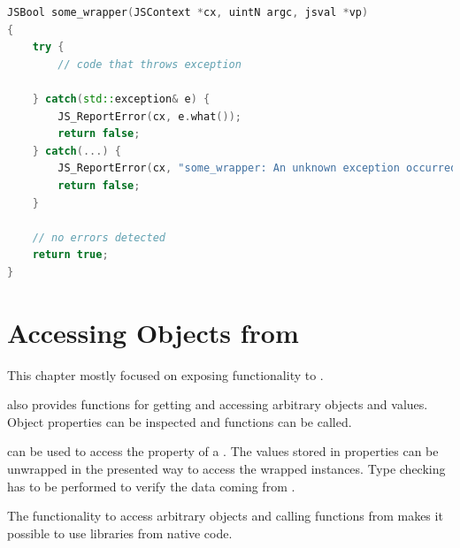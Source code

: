 \SingleSpacing
\begin{lstlisting}[language=C++, caption=Error handling at the language border]
JSBool some_wrapper(JSContext *cx, uintN argc, jsval *vp)
{
	try {
		// code that throws exception
		
	} catch(std::exception& e) {
		JS_ReportError(cx, e.what());
		return false;
	} catch(...) {
		JS_ReportError(cx, "some_wrapper: An unknown exception occurred");
		return false;
	}
	
	// no errors detected
	return true;
}
\end{lstlisting}
\OnehalfSpacing

\section{Accessing  Objects from }

This chapter mostly focused on exposing  functionality to .

 also provides functions for getting and accessing arbitrary  objects and values. Object properties can be inspected and functions can be called.

 can be used to access the property of a . The values stored in properties can be unwrapped in the presented way to access the wrapped  instances. Type checking has to be performed to verify the data coming from .

The functionality to access arbitrary  objects and calling  functions from  makes it possible to use  libraries from native code.